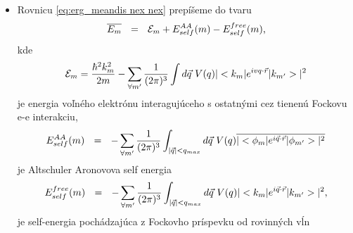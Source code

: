 \documentclass[
	11pt, %
]{beamer}
\begin{document}
\begin{frame}

\begin{itemize}
\item Rovnicu \eqref{eq:erg_meandis nex nex} prepíšeme do tvaru
\begin{equation}\label{eq:erg_meandis nex prepis skratka}
 \overline{E_m} \ \ = \ \ \mathcal{E}_m + E_{self}^{AA}(m) - E_{self}^{free}(m)  \text{,}
\end{equation}
kde
\begin{equation}\label{eq:erg_volna castica s ee}
\mathcal{E}_m = \frac{\hbar^2 k_m^2}{2m} - \sum_{\forall m'} \frac{1}{(2\pi)^{3}} \int d\vec{q}\ V(q) |<k_m|e^{ivq\cdot\vec{r}}|k_{m'}>|^2  \text{}
\end{equation}
je energia voľného elektrónu interagujúceho s ostatnými cez tienenú Fockovu e-e interakciu,
\begin{equation}\label{eq:erg_self AA}
 E_{self}^{AA}(m) \ \ = \ \  -\sum_{\forall m'} \frac{1}{(2\pi)^{3}} \int_{|\vec{q}| < q_{max}} d\vec{q}\ V(q) \overline{|<\phi_m|e^{i\vec{q}\cdot\vec{r}}|\phi_{m'}>|^2}  \text{}
\end{equation}
je Altschuler Aronovova self energia
\begin{equation}\label{eq:erg_self free}
 E_{self}^{free}(m) \ \ =  \ \  - \sum_{\forall m'} \frac{1}{(2\pi)^{3}} \int_{|\vec{q}| < q_{max}} d\vec{q}\ V(q) |<k_m|e^{i\vec{q}\cdot\vec{r}}|k_{m'}>|^2\text{,}
\end{equation}
je self-energia pochádzajúca z Fockovho príspevku od rovinných vĺn
\end{itemize}
\end{frame}
\end{document}
